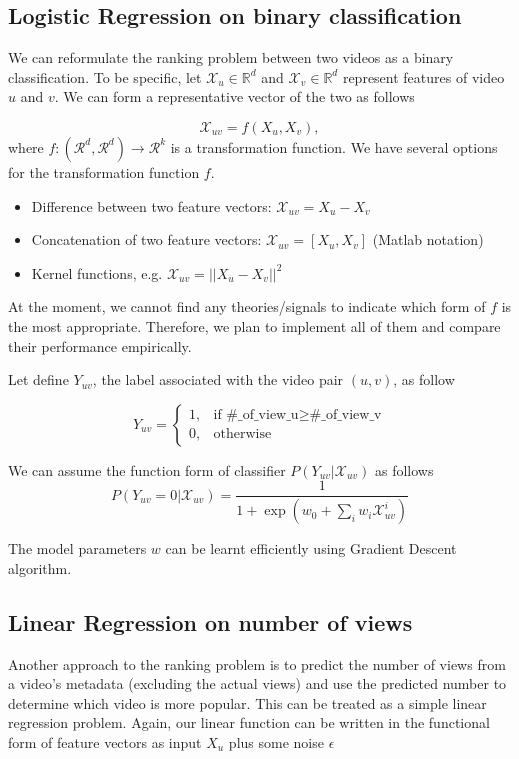 \documentclass{article} %
\begin{document}
	\subsection{Logistic Regression on binary classification}
	We can reformulate the ranking problem between two videos as a binary classification. To be specific, let $\mathcal{X}_u \in \mathbb{R}^d$ and $\mathcal{X}_v \in \mathbb{R}^d$ represent features of video $u$ and $v$. We can form a representative vector of the two as follows

	\begin{equation}
		\mathcal{X}_{uv} = f (X_u, X_v),
	\end{equation}
	where $f: (\mathcal{R}^d, \mathcal{R}^d) \rightarrow \mathcal{R}^k$ is a transformation function. We have several options for the transformation function $f$. 
	\begin{itemize}
		\item Difference between two feature vectors: $\mathcal{X}_{uv} = X_u - X_v$
		\item Concatenation of two feature vectors:  $\mathcal{X}_{uv} = [X_u, X_v]$ (Matlab notation)
		\item Kernel functions, e.g. $\mathcal{X}_{uv} = || X_u - X_v ||^2$
	\end{itemize}
	At the moment, we cannot find any theories/signals to indicate which form of $f$ is the most appropriate. Therefore, we plan to implement all of them and compare their performance empirically. 
	
	Let define $Y_{uv}$, the label associated with the video pair $(u, v)$, as follow
		
	\begin{equation}
		Y_{uv} = \begin{cases}
				   1, & \text{if } \text{\#\_of\_view\_u} \geq \text{\#\_of\_view\_v} \\
				   0, & \text{otherwise}
				\end{cases} 
	\end{equation}
	 
	 We can assume the function form of classifier $P(Y_{uv}|\mathcal{X}_{uv})$ as follows
	 \begin{equation}
		 P(Y_{uv}=0|\mathcal{X}_{uv}) = \frac{1}{1 + \exp ( w_0 + \sum_i w_i \mathcal{X}_{uv}^i )}
	 \end{equation}
	 
	The model parameters \textbf{$w$} can be learnt efficiently using Gradient Descent algorithm. 
	
	\subsection{Linear Regression on number of views}
	Another approach to the ranking problem is to predict the number of views from a video's metadata (excluding the actual views) and use the predicted number to determine which video is more popular. This can be treated as a simple linear regression problem. Again, our linear function can be written in the functional form of feature vectors as input $X_u$ plus some noise $\epsilon$
	
\end{document}
